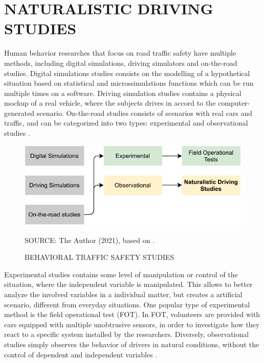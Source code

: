 \section{NATURALISTIC DRIVING STUDIES} \label{nds}


Human behavior researches that focus on road traffic safety have multiple methods, including digital simulations, driving simulators and on-the-road studies. Digital simulations studies consists on the modelling of a hypothetical situation based on statistical and microssimulations functions which can be run multiple times on a software. Driving simulation studies contains a physical mockup of a real vehicle, where the subjects drives in accord to the computer-generated scenario. On-the-road studies consists of scenarios with real cars and traffic, and can be categorized into two types: experimental and observational studies \cite{Shinar2017}. 

\begin{figure}[!htbp]
    \centering\footnotesize
    \captionsetup{font=footnotesize}
    \caption{BEHAVIORAL TRAFFIC SAFETY STUDIES}
    \includegraphics{fig/studies.pdf}
    \label{fig:shinar}
    \par SOURCE: The Author (2021), based on \textcite{Shinar2017}.
\end{figure}

Experimental studies contains some level of manipulation or control of the situation, where the independent variable is manipulated. This allows to better analyze the involved variables in a individual matter, but creates a artificial scenario, different from everyday situations. One popular type of experimental method is the field operational test (FOT). In FOT, volunteers are provided with cars equipped with multiple unobtrusive sensors, in order to investigate how they react to a specific system installed by the researchers. Diversely, observational studies simply observes the behavior of drivers in natural conditions, without the control of dependent and independent variables \cite{Shinar2017}. 

